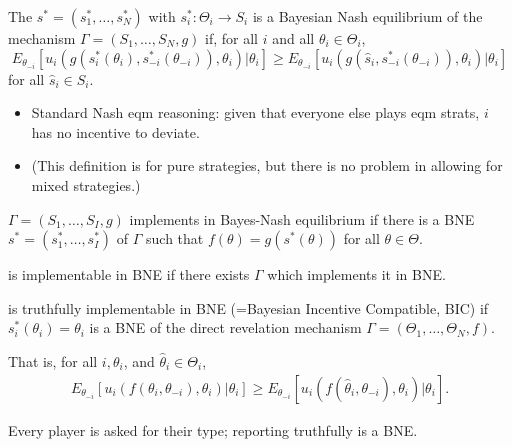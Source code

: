 \documentclass[english]{beamer}		%
\def\lyxframeend{} %
\begin{document}
\begin{definition}
	The  $s^* =(s_{1}^*,\dots,s_{N}^*)$ with $s_i^*: \Theta_i \to S_i$ is a \alert{Bayesian Nash equilibrium} of the mechanism $\Gamma=(S_{1},\dots,S_{N},g)$ if, for all $i$ and all $\theta_{i}\in\Theta_{i}$,
	$$E_{\theta_{-i}}\left[u_{i}(g(s_i^*(\theta_i),s_{-i}^*(\theta_{-i})),\theta_{i})|\theta_{i}\right]\geq E_{\theta_{-i}}\left[u_{i}(g(\hat s_i,s_{-i}^*(\theta_{-i})),\theta_{i})|\theta_{i}\right]$$
	for all $\hat s_{i}\in S_{i}$.
\end{definition}
\pause
\begin{itemize}
	\item Standard Nash eqm reasoning: given that everyone else plays eqm strats, $i$ has no incentive to deviate.
	\item (This definition is for pure strategies, but there is no problem in allowing for mixed strategies.)
\end{itemize}
\vspace{-1em}
\lyxframeend


\begin{definition}
	 $\Gamma=(S_{1},\dots,S_{I},g)$ \alert{implements  in Bayes-Nash equilibrium} if there is a BNE $s^*=(s_{1}^*,\dots,s_{I}^*)$ of $\Gamma$ such that $f(\theta)=g(s^{*}(\theta))$ for all $\theta\in \Theta$.
\end{definition}
\pause
\begin{definition}
	 is \alert{implementable in BNE} if there exists $\Gamma$ which implements it in BNE.
\end{definition}
\lyxframeend


\begin{definition}
	 is \alert{truthfully implementable in BNE} (=Bayesian Incentive Compatible, \alert{BIC}) if $s_{i}^*(\theta_{i})=\theta_{i}$ is a BNE of the direct revelation mechanism $\Gamma=(\Theta_{1},\dots,\Theta_{N},f)$. 
	\bigskip
	
	That is, for all $i,\theta_{i}$, and $\hat{\theta}_{i}\in\Theta_{i}$,
	\vspace{-0.5em}\begin{align*}
		E_{\theta_{-i}}\left[u_{i}(f(\theta_i,\theta_{-i}),\theta_{i})|\theta_{i}\right]\geq E_{\theta_{-i}}\left[u_{i}(f(\hat \theta_{i},\theta_{-i}),\theta_{i})|\theta_{i}\right].
	\end{align*}\vspace{-1em}
\end{definition}
\pause
Every player is asked for their type; reporting truthfully is a BNE.
\lyxframeend
\end{document}
